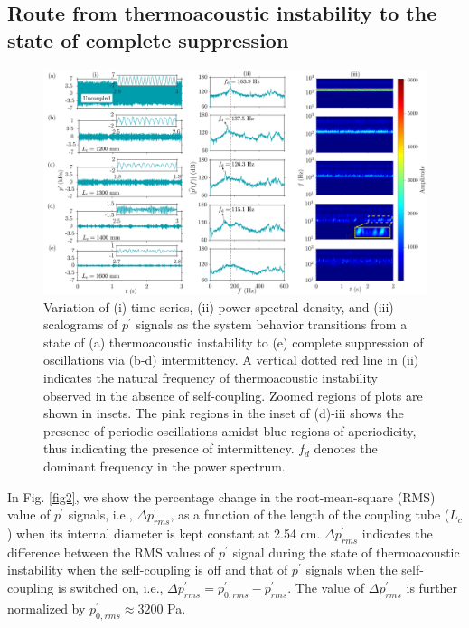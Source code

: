 \documentclass[%
preprint,
 amsmath,amssymb,
 aps,
 pra,
]{revtex4-2}
\begin{document}
\subsection{Route from thermoacoustic instability to the state of complete suppression} \addvspace{10pt}
\begin{figure}[t!]
\centering
\includegraphics[width=1\textwidth]{fig3.png}
\caption{Variation of (i) time series, (ii) power spectral density, and (iii) scalograms of $p^\prime$ signals as the system behavior transitions from a state of (a) thermoacoustic instability to (e) complete suppression of oscillations via (b-d) intermittency. A vertical dotted red line in (ii) indicates the natural frequency of thermoacoustic instability observed in the absence of self-coupling. Zoomed regions of plots are shown in insets. The pink regions in the inset of (d)-iii shows the presence of periodic oscillations amidst blue regions of aperiodicity, thus indicating the presence of intermittency. $f_d$ denotes the dominant frequency in the power spectrum.
}
\label{fig3}
\end{figure}

In Fig. \ref{fig2}, we show the percentage change in the root-mean-square (RMS) value of $p^{\prime}$ signals, i.e., $\Delta p^\prime_{rms}$, as a function of the length of the coupling tube ($L_c$) when its internal diameter is kept constant at 2.54 cm. $\Delta p^\prime_{rms}$ indicates the difference between the RMS values of $p^{\prime}$ signal during the state of thermoacoustic instability when the self-coupling is off and that of $p^{\prime}$ signals when the self-coupling is switched on, i.e., $\Delta p^\prime_{rms} = p^\prime_{0,rms}-p^\prime_{rms}$. The value of $\Delta p^\prime_{rms}$ is further normalized by $p^\prime_{0,rms}\approx 3200$ Pa. 
\end{document}
